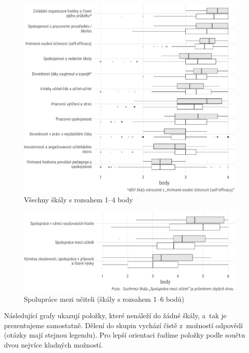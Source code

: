 \documentclass[12pt,a4paper,]{report}
\begin{document}
\begin{figure}

{\centering \includegraphics[width=\textwidth]{figs/scales1to4-1} 

}

\caption{Všechny škály s rozsahem 1--4 body}\label{fig:scales1to4}
\end{figure}

\begin{figure}

{\centering \includegraphics[width=\textwidth]{figs/scales1to6-1} 

}

\caption{Spolupráce mezi učiteli (škály s rozsahem 1--6 bodů)}\label{fig:scales1to6}
\end{figure}

Následující grafy ukazují položky, které nenáleží do žádné škály, a~tak je prezentujeme samostatně. Dělení do skupin vychází čistě z~možností odpovědí (otázky mají stejnou legendu). Pro lepší orientaci řadíme položky podle součtu dvou nejvíce kladných možností.
\end{document}
